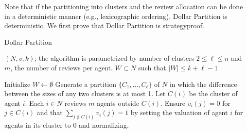 \documentclass[letterpaper]{article}
\renewcommand{\algorithmicrequire}{\textbf{Input:}}
\renewcommand{\algorithmicensure}{\textbf{Output:}}
\newlength{\wordlength}
\newcommand{\wordbox}[3][c]{\settowidth{\wordlength}{#3}\makebox[\wordlength][#1]{#2}}
\begin{document}
Note that if the partitioning into clusters and the review allocation can be done in a deterministic manner (e.g., lexicographic ordering), Dollar Partition is deterministic. We first prove that Dollar Partition is strategyproof.




		\begin{algorithm}[ht!]
		 \caption{Dollar Partition}
		 \label{algo:DP}
		\renewcommand{\algorithmicrequire}{\wordbox[l]{\textbf{Input}:}{\textbf{Output}:}}
		 \renewcommand{\algorithmicensure}{\wordbox[l]{\textbf{Output}:}{\textbf{Output}:}}
		\footnotesize
		\begin{algorithmic}
			\footnotesize
			\REQUIRE $(N,v,k)$; the algorithm is parametrized by number of clusters $2\leq \ell\leq n$ and $m$, the number of reviews per agent.
			\ENSURE $W\subset N$ such that $|W|\leq k+\ell-1$
		\end{algorithmic}
		 \begin{algorithmic}[1]
				\footnotesize

			 \STATE Initialize $W\longleftarrow \emptyset$
			 \STATE Generate a partition $\{C_1,\ldots, C_{\ell}\}$ of $N$ in which the difference between the sizes of any two clusters is at most 1. Let $C(i)$ be the cluster of agent $i$. %
			 \STATE
			 Each $i\in N$ reviews $m$ agents outside $C(i)$.
			 Ensure $v_i(j)=0$ for $j\in C(i)$ and that $\sum_{j\notin C(i)}v_i(j)=1$ by setting the valuation of agent $i$ for agents in its cluster to $0$ and normalizing.


\end{algorithmic}
\end{algorithm}
\end{document}
